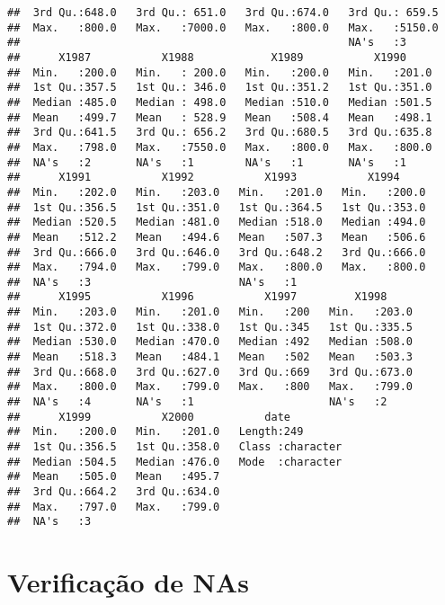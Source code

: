 \documentclass[]{book}
\theoremstyle{definition}
\theoremstyle{definition}
\theoremstyle{definition}
\theoremstyle{remark}
\begin{document}
\begin{verbatim}
##  3rd Qu.:648.0   3rd Qu.: 651.0   3rd Qu.:674.0   3rd Qu.: 659.5  
##  Max.   :800.0   Max.   :7000.0   Max.   :800.0   Max.   :5150.0  
##                                                   NA's   :3       
##      X1987           X1988            X1989           X1990      
##  Min.   :200.0   Min.   : 200.0   Min.   :200.0   Min.   :201.0  
##  1st Qu.:357.5   1st Qu.: 346.0   1st Qu.:351.2   1st Qu.:351.0  
##  Median :485.0   Median : 498.0   Median :510.0   Median :501.5  
##  Mean   :499.7   Mean   : 528.9   Mean   :508.4   Mean   :498.1  
##  3rd Qu.:641.5   3rd Qu.: 656.2   3rd Qu.:680.5   3rd Qu.:635.8  
##  Max.   :798.0   Max.   :7550.0   Max.   :800.0   Max.   :800.0  
##  NA's   :2       NA's   :1        NA's   :1       NA's   :1      
##      X1991           X1992           X1993           X1994      
##  Min.   :202.0   Min.   :203.0   Min.   :201.0   Min.   :200.0  
##  1st Qu.:356.5   1st Qu.:351.0   1st Qu.:364.5   1st Qu.:353.0  
##  Median :520.5   Median :481.0   Median :518.0   Median :494.0  
##  Mean   :512.2   Mean   :494.6   Mean   :507.3   Mean   :506.6  
##  3rd Qu.:666.0   3rd Qu.:646.0   3rd Qu.:648.2   3rd Qu.:666.0  
##  Max.   :794.0   Max.   :799.0   Max.   :800.0   Max.   :800.0  
##  NA's   :3                       NA's   :1                      
##      X1995           X1996           X1997         X1998      
##  Min.   :203.0   Min.   :201.0   Min.   :200   Min.   :203.0  
##  1st Qu.:372.0   1st Qu.:338.0   1st Qu.:345   1st Qu.:335.5  
##  Median :530.0   Median :470.0   Median :492   Median :508.0  
##  Mean   :518.3   Mean   :484.1   Mean   :502   Mean   :503.3  
##  3rd Qu.:668.0   3rd Qu.:627.0   3rd Qu.:669   3rd Qu.:673.0  
##  Max.   :800.0   Max.   :799.0   Max.   :800   Max.   :799.0  
##  NA's   :4       NA's   :1                     NA's   :2      
##      X1999           X2000           date          
##  Min.   :200.0   Min.   :201.0   Length:249        
##  1st Qu.:356.5   1st Qu.:358.0   Class :character  
##  Median :504.5   Median :476.0   Mode  :character  
##  Mean   :505.0   Mean   :495.7                     
##  3rd Qu.:664.2   3rd Qu.:634.0                     
##  Max.   :797.0   Max.   :799.0                     
##  NA's   :3
\end{verbatim}

\hypertarget{verificauxe7uxe3o-de-nas}{%
\section{Verificação de NAs}\label{verificauxe7uxe3o-de-nas}}
\end{document}

